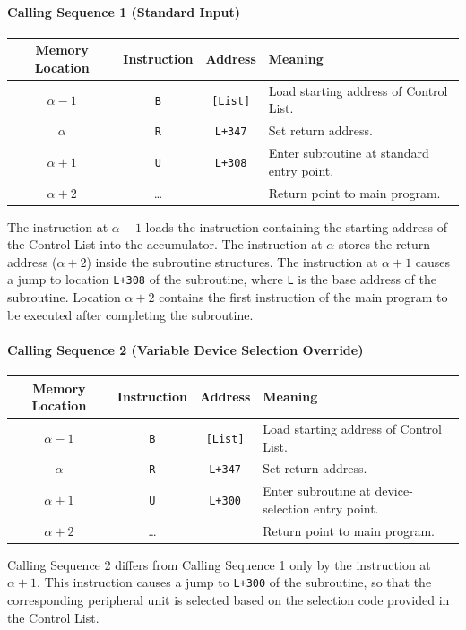 \paragraph{Calling Sequence 1 (Standard Input)}
\begin{table}[h!]
\centering
\begin{tabularx}{\textwidth}{cccX}
\toprule
\textbf{Memory Location} & \textbf{Instruction} & \textbf{Address} & \textbf{Meaning} \\
\midrule
$\alpha-1$   & \texttt{B} & \texttt{[List]} & Load starting address of Control List. \\
$\alpha$     & \texttt{R} & \texttt{L+347}  & Set return address. \\
$\alpha+1$   & \texttt{U} & \texttt{L+308}  & Enter subroutine at standard entry point. \\
$\alpha+2$   & \dots      &                  & Return point to main program. \\
\bottomrule
\end{tabularx}
\end{table}
The instruction at $\alpha-1$ loads the instruction containing the starting address of the Control List into the accumulator. The instruction at $\alpha$ stores the return address ($\alpha+2$) inside the subroutine structures. The instruction at $\alpha+1$ causes a jump to location \texttt{L+308} of the subroutine, where \texttt{L} is the base address of the subroutine. Location $\alpha+2$ contains the first instruction of the main program to be executed after completing the subroutine.

\paragraph{Calling Sequence 2 (Variable Device Selection Override)}
\begin{table}[h!]
\centering
\begin{tabularx}{\textwidth}{cccX}
\toprule
\textbf{Memory Location} & \textbf{Instruction} & \textbf{Address} & \textbf{Meaning} \\
\midrule
$\alpha-1$   & \texttt{B} & \texttt{[List]} & Load starting address of Control List. \\
$\alpha$     & \texttt{R} & \texttt{L+347}  & Set return address. \\
$\alpha+1$   & \texttt{U} & \texttt{L+300}  & Enter subroutine at device-selection entry point. \\
$\alpha+2$   & \dots      &                  & Return point to main program. \\
\bottomrule
\end{tabularx}
\end{table}
Calling Sequence 2 differs from Calling Sequence 1 only by the instruction at $\alpha+1$. This instruction causes a jump to \texttt{L+300} of the subroutine, so that the corresponding peripheral unit is selected based on the selection code provided in the Control List.


